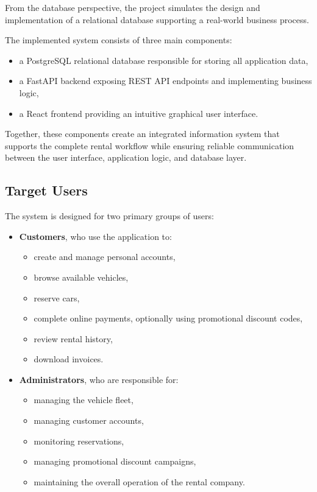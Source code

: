 From the database perspective, the project simulates the design and implementation of a relational database supporting a real-world business process.

The implemented system consists of three main components:

\begin{itemize}
    \item a PostgreSQL relational database responsible for storing all application data,
    \item a FastAPI backend exposing REST API endpoints and implementing business logic,
    \item a React frontend providing an intuitive graphical user interface.
\end{itemize}

Together, these components create an integrated information system that supports the complete rental workflow while ensuring reliable communication between the user interface, application logic, and database layer.

\subsection{Target Users}

The system is designed for two primary groups of users:

\begin{itemize}
    \item \textbf{Customers}, who use the application to:
    \begin{itemize}
        \item create and manage personal accounts,
        \item browse available vehicles,
        \item reserve cars,
        \item complete online payments, optionally using promotional discount codes,
        \item review rental history,
        \item download invoices.
    \end{itemize}

    \item \textbf{Administrators}, who are responsible for:
    \begin{itemize}
        \item managing the vehicle fleet,
        \item managing customer accounts,
        \item monitoring reservations,
        \item managing promotional discount campaigns,
        \item maintaining the overall operation of the rental company.
    \end{itemize}
\end{itemize}